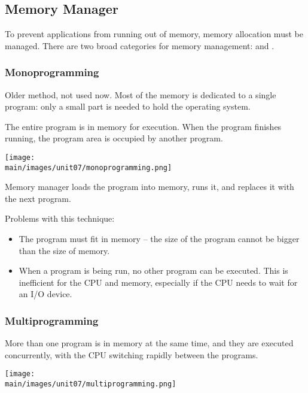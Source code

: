 \documentclass[\main/notes.tex]{subfiles}
\begin{document}
			\subsection{Memory Manager}
				To prevent applications from running out of memory, memory allocation must be managed. There are two broad categories for memory management:  and .
				\subsubsection{Monoprogramming}
					Older method, not used now. Most of the memory is dedicated to a single program: only a small part is needed to hold the operating system.

					The entire program is in memory for execution. When the program finishes running, the program area is occupied by another program.
					\begin{center}
						\texttt{[image: \\main/images/unit07/monoprogramming.png]}
					\end{center}

					Memory manager loads the program into memory, runs it, and replaces it with the next program.

					Problems with this technique:
					\begin{indentparagraph}
						\begin{itemize}
							\item The program must fit in memory -- the size of the program cannot be bigger than the size of memory.
							\item When a program is being run, no other program can be executed. This is inefficient for the CPU and memory, especially if the CPU needs to wait for an I/O device.
						\end{itemize}
					\end{indentparagraph}
				\subsubsection{Multiprogramming}
					More than one program is in memory at the same time, and they are executed concurrently, with the CPU switching rapidly between the programs.
					\begin{center}
						\texttt{[image: \\main/images/unit07/multiprogramming.png]}
					\end{center}
\end{document}
